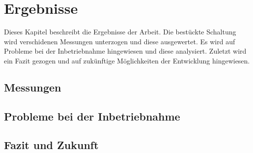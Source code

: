 \chapter{Ergebnisse} 
Dieses Kapitel beschreibt die Ergebnisse der Arbeit.
Die bestückte Schaltung wird verschidenen Messungen unterzogen und diese 
ausgewertet.
Es wird auf Probleme bei der Inbetriebnahme hingewiesen und diese analysiert.
Zuletzt wird ein Fazit gezogen und auf zukünftige Möglichkeiten der Entwicklung
hingewiesen.
\section{Messungen}
\section{Probleme bei der Inbetriebnahme}
\section{Fazit und Zukunft} 